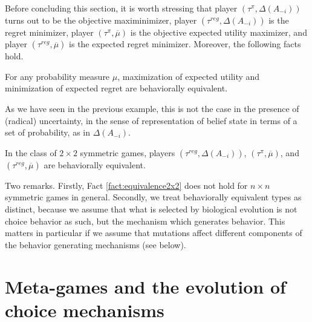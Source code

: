 \documentclass[fleqn,reqno,11pt]{article}
\begin{document}
Before concluding this section, it is worth stressing that player $(\tau^{\pi}, \Delta(A_{-i}))$ turns out to be the objective maximinimizer, player $(\tau^{reg}, \Delta(A_{-i}))$ is the regret minimizer, player $(\tau^{\pi}, \overline{\mu})$ is the objective expected utility maximizer, and player $(\tau^{reg}, \overline{\mu})$ is the expected regret minimizer. Moreover, the following facts hold.

\begin{fact} \label{fact:maxEU-minReg}

For any probability measure $\mu$, maximization of expected utility and minimization of expected regret are behaviorally equivalent.

\end{fact}

\noindent As we have seen in the previous example, this is not the case in the presence of (radical) uncertainty, in the sense of representation of belief state in terms of a set of probability, as in $ \Delta(A_{-i}) $.

\begin{fact} \label{fact:equivalence2x2}

In the class of $2 \times 2$ symmetric games, players $(\tau^{reg}, \Delta(A_{-i}))$, $(\tau^{\pi}, \overline{\mu})$, and $(\tau^{reg},\overline{\mu})$ are behaviorally equivalent.

\end{fact} 

\noindent Two remarks. Firstly, Fact \ref{fact:equivalence2x2} does not hold for $n \times n$
symmetric games in general. Secondly, we treat behaviorally equivalent types as distinct,
because we assume that what is selected by biological evolution is not choice behavior as such,
but the mechanism which generates behavior. This matters in particular if we assume that
mutations affect different components of the behavior generating mechanisms (see below). 

\fi






\newpage

\section{Meta-games and the evolution of choice mechanisms}
\label{sec:model}
\end{document}
